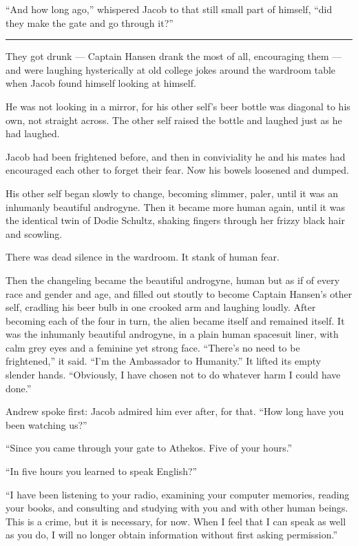 \documentclass[english,11pt,letterpaper,onecolumn]{scrbook}
\begin{document}
	``And how long ago,'' whispered Jacob to that still small part of himself, ``did they make the gate and go through it?''

\begin{center}\rule[3pt]{2in}{0.5pt}\end{center}

	They got drunk --- Captain Hansen drank the most of all, encouraging them --- and were laughing hysterically at old college jokes around the wardroom table when Jacob found himself looking at himself.

	He was not looking in a mirror, for his other self's beer bottle was diagonal to his own, not straight across.  The other self raised the bottle and laughed just as he had laughed.

	Jacob had been frightened before, and then in conviviality he and his mates had encouraged each other to forget their fear.  Now his bowels loosened and dumped.

	His other self began slowly to change, becoming slimmer, paler, until it was an inhumanly beautiful androgyne.  Then it became more human again, until it was the identical twin of Dodie Schultz, shaking fingers through her frizzy black hair and scowling.

	There was dead silence in the wardroom.  It stank of human fear.

	Then the changeling became the beautiful androgyne, human but as if of every race and gender and age, and filled out stoutly to become Captain Hansen's other self, cradling his beer bulb in one crooked arm and laughing loudly.
	After becoming each of the four in turn, the alien became itself and remained itself.  It was the inhumanly beautiful androgyne, in a plain human spacesuit liner, with calm grey eyes and a feminine yet strong face.  ``There's no need to be frightened,'' it said.  ``I'm the Ambassador to Humanity.''  It lifted its empty slender hands.  ``Obviously, I have chosen not to do whatever harm I could have done.''

	Andrew spoke first:  Jacob admired him ever after, for that.  ``How long have you been watching us?''

	``Since you came through your gate to Athekos.  Five of your hours.''

	``In five hours you learned to speak English?''

	``I have been listening to your radio, examining your computer memories, reading your books, and consulting and studying with you and with other human beings.  This is a crime, but it is necessary, for now.  When I feel that I can speak as well as you do, I will no longer obtain information without first asking permission.''
\end{document}
